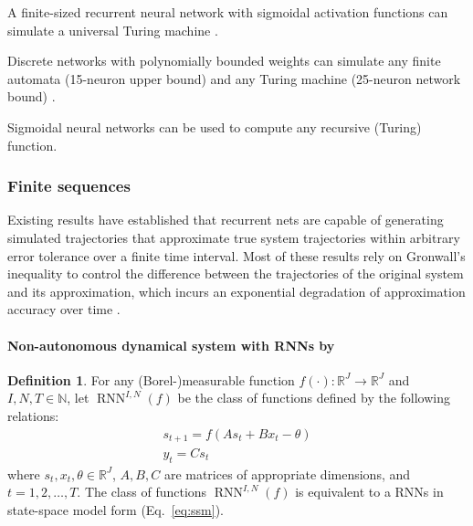 \documentclass{article}
\theoremstyle{definition}
\newtheorem{definition}{Definition}
\theoremstyle{remark}
\begin{document}
A finite-sized recurrent neural network with sigmoidal activation functions can simulate a universal Turing machine \citep{siegelmann1992computational}.

Discrete networks with polynomially bounded weights can simulate any finite automata (15-neuron upper bound) and any Turing machine (25-neuron network bound) \citep{indyk1995optimal}.

Sigmoidal neural networks can be used to compute any recursive (Turing) function\citep{kilian1996}.



\subsubsection{Finite sequences}
Existing results have established that recurrent nets are capable of generating simulated trajectories that approximate true system trajectories within arbitrary error tolerance over a finite time interval.
Most of these results rely on Gr\:onwall’s inequality to control the difference between the trajectories of the original system and its approximation, which incurs an exponential degradation of approximation accuracy over time
\citep{sontag1992neural, sontag1998learning, funahashi1993approximation,chow2000modeling, li2005approximation}.

\paragraph{Non-autonomous dynamical system with RNNs by \citet{schafer2007}} %
\begin{definition}\label{def:rnn}
For any (Borel-)measurable function \( f(\cdot): \mathbb{R}^J \rightarrow \mathbb{R}^J \) and \( I, N, T \in \mathbb{N} \), let \(\operatorname{RNN}^{I,N}(f) \) be the class of functions defined by the following relations:
\begin{align}  \label{eq:ssm}
s_{t+1} = f(A s_t + B x_t - \theta)\\
y_t = C s_t
\end{align}
where \( s_t, x_t, \theta \in \mathbb{R}^J \), \( A, B, C \) are matrices of appropriate dimensions, and \( t = 1, 2, \dots, T \).
The class of functions \( \operatorname{RNN}^{I,N}(f) \) is equivalent to a RNNs in state-space model form (Eq.~\ref{eq:ssm}).
\end{definition}

\end{document}
